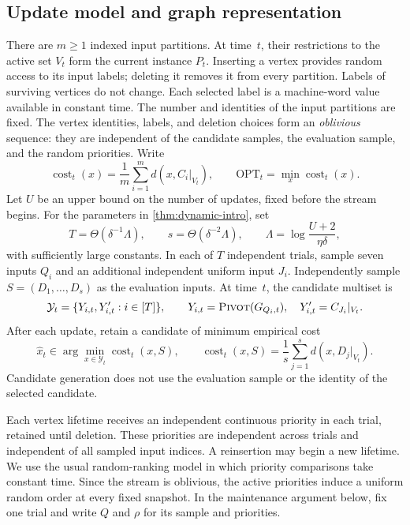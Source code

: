 \documentclass[11pt,letterpaper]{article}
\theoremstyle{definition}
\theoremstyle{remark}
\newcommand{\OPT}{\mathrm{OPT}}
\newcommand{\cost}{\operatorname{cost}}
\newcommand{\1}{\mathbf{1}}
\newcommand{\Pivot}{\textnormal{\textsc{Pivot}}}
\begin{document}
\subsection{Update model and graph representation}

There are $m\ge1$ indexed input partitions.  At time~$t$, their restrictions to the active set $V_t$ form the current instance $P_t$.  Inserting a vertex provides random access to its input labels; deleting it removes it from every partition.  Labels of surviving vertices do not change.  Each selected label is a machine-word value available in constant time.  The number and identities of the input partitions are fixed.  The vertex identities, labels, and deletion choices form an \emph{oblivious} sequence: they are independent of the candidate samples, the evaluation sample, and the random priorities.  Write
\[
 \cost_t(x)=\frac1m\sum_{i=1}^m d(x,C_i|_{V_t}),
 \qquad
 \OPT_t=\min_x\cost_t(x).
\]
Let $U$ be an upper bound on the number of updates, fixed before the stream begins.  For the parameters in \cref{thm:dynamic-intro}, set
\begin{equation}\label{eq:dynamic-sample-sizes}
 T=\Theta(\delta^{-1}\Lambda),
 \qquad s=\Theta(\delta^{-2}\Lambda),
 \qquad \Lambda=\log\frac{U+2}{\eta\delta},
\end{equation}
with sufficiently large constants.  In each of $T$ independent trials, sample seven inputs $Q_i$ and an additional independent uniform input $J_i$.  Independently sample $S=(D_1,\ldots,D_s)$ as the evaluation inputs.  At time~$t$, the candidate multiset is
\[
 \mathcal Y_t=\{Y_{i,t},Y'_{i,t}:i\in[T]\},
 \qquad Y_{i,t}=\Pivot(G_{Q_i,t}),
 \quad Y'_{i,t}=C_{J_i}|_{V_t}.
\]
After each update, retain a candidate of minimum empirical cost
\begin{equation}\label{eq:dynamic-choice}
 \widehat x_t\in\arg\min_{x\in\mathcal Y_t}\cost_t(x,S),
 \qquad
 \cost_t(x,S)=\frac1s\sum_{j=1}^s d(x,D_j|_{V_t}).
\end{equation}
Candidate generation does not use the evaluation sample or the identity of the selected candidate.

Each vertex lifetime receives an independent continuous priority in each trial, retained until deletion.  These priorities are independent across trials and independent of all sampled input indices.  A reinsertion may begin a new lifetime.  We use the usual random-ranking model in which priority comparisons take constant time.  Since the stream is oblivious, the active priorities induce a uniform random order at every fixed snapshot.  In the maintenance argument below, fix one trial and write $Q$ and $\rho$ for its sample and priorities.
\end{document}
